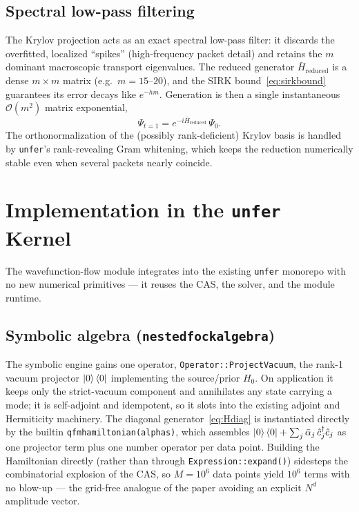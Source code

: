 \documentclass[11pt, a4paper]{article}
\begin{document}
\subsection{Spectral low-pass filtering}

The Krylov projection acts as an exact spectral low-pass filter: it discards
the overfitted, localized ``spikes'' (high-frequency packet detail) and
retains the $m$ dominant macroscopic transport eigenvalues. The reduced
generator $\bar H_{\mathrm{reduced}}$ is a dense $m\times m$ matrix (e.g.\
$m=15$--$20$), and the SIRK bound~\eqref{eq:sirkbound} guarantees its error
decays like $e^{-hm}$. Generation is then a single instantaneous
$\mathcal{O}(m^2)$ matrix exponential,
\begin{equation}
  \Psi_{t=1}=e^{-i\bar H_{\mathrm{reduced}}}\,\Psi_0 .
\end{equation}
The orthonormalization of the (possibly rank-deficient) Krylov basis is handled
by \texttt{unfer}'s rank-revealing Gram whitening, which keeps the reduction
numerically stable even when several packets nearly coincide.

\section{Implementation in the \texttt{unfer} Kernel}
\label{sec:impl}

The wavefunction-flow module integrates into the existing \texttt{unfer}
monorepo with no new numerical primitives --- it reuses the CAS, the solver, and
the module runtime.

\subsection{Symbolic algebra (\texttt{nested\textunderscore fock\textunderscore algebra})}

The symbolic engine gains one operator, \texttt{Operator::ProjectVacuum}, the
rank-1 vacuum projector $\ket{0}\bra{0}$ implementing the source/prior $H_0$.
On application it keeps only the strict-vacuum component and annihilates any
state carrying a mode; it is self-adjoint and idempotent, so it slots into the
existing adjoint and Hermiticity machinery. The diagonal generator~\eqref{eq:Hdiag}
is instantiated directly by the builtin
\texttt{qfm\textunderscore hamiltonian(alphas)}, which assembles
$\ket{0}\bra{0}+\sum_j\bar\alpha_j\,\hat c_j^\dagger\hat c_j$ as one projector
term plus one number operator per data point. Building the Hamiltonian
directly (rather than through \texttt{Expression::expand()}) sidesteps the
combinatorial explosion of the CAS, so $M=10^6$ data points yield $10^6$ terms
with no blow-up --- the grid-free analogue of the paper avoiding an explicit
$N^d$ amplitude vector.
\end{document}
